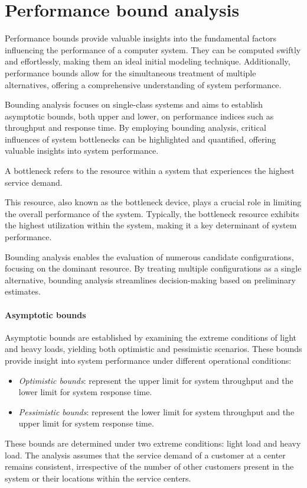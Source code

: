 \section{Performance bound analysis}

Performance bounds provide valuable insights into the fundamental factors influencing the performance of a computer system.
They can be computed swiftly and effortlessly, making them an ideal initial modeling technique.
Additionally, performance bounds allow for the simultaneous treatment of multiple alternatives, offering a comprehensive understanding of system performance.

Bounding analysis focuses on single-class systems and aims to establish asymptotic bounds, both upper and lower, on performance indices such as throughput and response time.
By employing bounding analysis, critical influences of system bottlenecks can be highlighted and quantified, offering valuable insights into system performance.
\begin{definition}
    A bottleneck refers to the resource within a system that experiences the highest service demand.
\end{definition}
This resource, also known as the bottleneck device, plays a crucial role in limiting the overall performance of the system. 
Typically, the bottleneck resource exhibits the highest utilization within the system, making it a key determinant of system performance.

Bounding analysis enables the evaluation of numerous candidate configurations, focusing on the dominant resource. 
By treating multiple configurations as a single alternative, bounding analysis streamlines decision-making based on preliminary estimates.

\paragraph*{Asymptotic bounds}
Asymptotic bounds are established by examining the extreme conditions of light and heavy loads, yielding both optimistic and pessimistic scenarios. 
These bounds provide insight into system performance under different operational conditions:
\begin{itemize}
    \item \textit{Optimistic bounds}: represent the upper limit for system throughput and the lower limit for system response time.
    \item \textit{Pessimistic bounds}: represent the lower limit for system throughput and the upper limit for system response time.
\end{itemize}
These bounds are determined under two extreme conditions: light load and heavy load. 
The analysis assumes that the service demand of a customer at a center remains consistent, irrespective of the number of other customers present in the system or their locations within the service centers.

